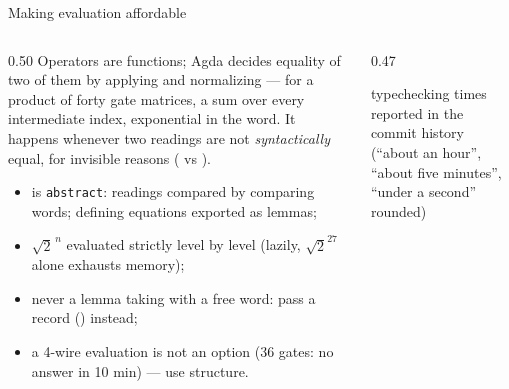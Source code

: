 \begin{frame}{Making evaluation affordable \New}
\begin{columns}[c]
\begin{column}{0.50\textwidth}
\small Operators are functions; Agda decides equality of two of them by
applying and normalizing --- for a product of forty gate matrices, a sum over
every intermediate index, \alert{exponential in the word}. It happens whenever two
readings are not \emph{syntactically} equal, for invisible reasons
( vs ).
\begin{itemize}
  \item {} is \alert{\texttt{abstract}}: readings compared by comparing
        words; defining equations exported as lemmas;
  \item $\sqrt2^{\,n}$ evaluated strictly level by level (lazily,
        $\sqrt2^{27}$ alone exhausts memory);
  \item never a lemma taking  with a free word: pass a
        record () instead;
  \item a 4-wire evaluation is \alert{not an option} (36 gates: no answer in
        10 min) --- use structure.
\end{itemize}
\end{column}
\begin{column}{0.47\textwidth}
\centering
{}

{\scriptsize typechecking times reported in the commit history (``about an hour'',
``about five minutes'', ``under a second'' rounded)}
\end{column}
\end{columns}
\end{frame}
